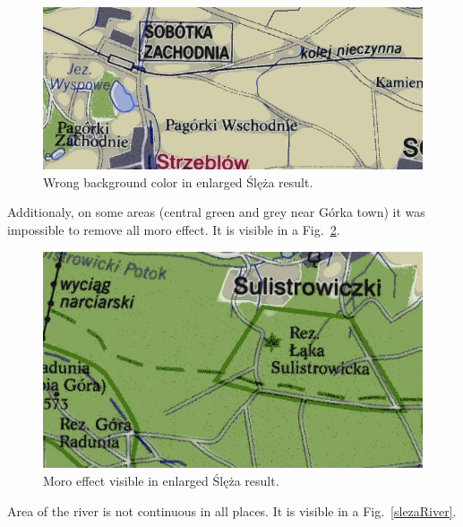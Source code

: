 \documentclass[a4paper,onecolumn,oneside,12pt]{memoir}
\begin{document}
\begin{figure}[!ht]
\begin{center}
\includegraphics[scale=0.5]{images/badBackgroundSleza.png}
\caption{Wrong background color in enlarged Ślęża result.}
\label{badBackgroundSleza}
\end{center}
\end{figure}

Additionaly, on some areas (central green and grey near Górka town) it was
impossible to remove all moro effect. It is visible in a Fig.~\ref{moroSlezaIO}.

\begin{figure}[!ht]
\begin{center}
\includegraphics[scale=0.5]{images/moroSlezaResult.png}
\caption{Moro effect visible in enlarged Ślęża result.}
\label{moroSlezaIO}
\end{center}
\end{figure}

Area of the river is not continuous in all places. It is visible in a Fig.~\ref{slezaRiver}.
\end{document}
